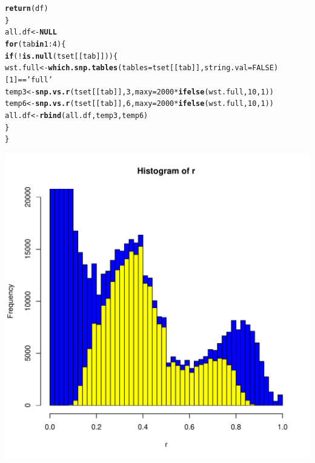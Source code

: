 \documentclass{article}\usepackage[]{graphicx}\usepackage[]{color}
\makeatletter
\def\maxwidth{ %
  \ifdim\Gin@nat@width>\linewidth
    \linewidth
  \else
    \Gin@nat@width
  \fi
}
\newcommand{\hlnum}[1]{\textcolor[rgb]{0.686,0.059,0.569}{#1}}%
\newcommand{\hlstr}[1]{\textcolor[rgb]{0.192,0.494,0.8}{#1}}%
\newcommand{\hlopt}[1]{\textcolor[rgb]{0,0,0}{#1}}%
\newcommand{\hlstd}[1]{\textcolor[rgb]{0.345,0.345,0.345}{#1}}%
\newcommand{\hlkwa}[1]{\textcolor[rgb]{0.161,0.373,0.58}{\textbf{#1}}}%
\newcommand{\hlkwb}[1]{\textcolor[rgb]{0.69,0.353,0.396}{#1}}%
\newcommand{\hlkwc}[1]{\textcolor[rgb]{0.333,0.667,0.333}{#1}}%
\newcommand{\hlkwd}[1]{\textcolor[rgb]{0.737,0.353,0.396}{\textbf{#1}}}%
\newenvironment{kframe}{%
 \def\at@end@of@kframe{}%
 \ifinner\ifhmode%
  \def\at@end@of@kframe{\end{minipage}}%
  \begin{minipage}{\columnwidth}%
 \fi\fi%
 \def\FrameCommand##1{\hskip\@totalleftmargin \hskip-\fboxsep
 \colorbox{shadecolor}{##1}\hskip-\fboxsep
     \hskip-\linewidth \hskip-\@totalleftmargin \hskip\columnwidth}%
 \MakeFramed {\advance\hsize-\width
   \@totalleftmargin\z@ \linewidth\hsize
   \@setminipage}}%
 {\par\unskip\endMakeFramed%
 \at@end@of@kframe}
\newenvironment{knitrout}{}{} %
\makeatother
\begin{document}
\begin{knitrout}
\begin{kframe}
\begin{alltt}
  \hlkwd{return}\hlstd{(df)}
\hlstd{\}}
\hlstd{all.df} \hlkwb{<-} \hlkwa{NULL}
\hlkwa{for}\hlstd{(tab} \hlkwa{in} \hlnum{1}\hlopt{:}\hlnum{4}\hlstd{)\{}
  \hlkwa{if}\hlstd{(}\hlopt{!}\hlkwd{is.null}\hlstd{(tset[[tab]]))\{}
    \hlstd{wst.full} \hlkwb{<-} \hlkwd{which.snp.tables}\hlstd{(}\hlkwc{tables}\hlstd{=tset[[tab]],} \hlkwc{string.val}\hlstd{=}\hlnum{FALSE}\hlstd{)[}\hlnum{1}\hlstd{]} \hlopt{==} \hlstr{'full'}
    \hlstd{temp3} \hlkwb{<-} \hlkwd{snp.vs.r}\hlstd{(tset[[tab]],}\hlnum{3}\hlstd{,}\hlkwc{maxy}\hlstd{=}\hlnum{2000}\hlopt{*}\hlkwd{ifelse}\hlstd{(wst.full,}\hlnum{10}\hlstd{,}\hlnum{1}\hlstd{))}
    \hlstd{temp6} \hlkwb{<-} \hlkwd{snp.vs.r}\hlstd{(tset[[tab]],}\hlnum{6}\hlstd{,}\hlkwc{maxy}\hlstd{=}\hlnum{2000}\hlopt{*}\hlkwd{ifelse}\hlstd{(wst.full,}\hlnum{10}\hlstd{,}\hlnum{1}\hlstd{))}
    \hlstd{all.df} \hlkwb{<-} \hlkwd{rbind}\hlstd{(all.df,temp3,temp6)}
  \hlstd{\}}
\hlstd{\}}
\end{alltt}
\end{kframe}
\includegraphics[width=\maxwidth]{FigS7-hwe-histo-figs-knitr/unnamed-chunk-12-1} 


\end{knitrout}
\end{document}
